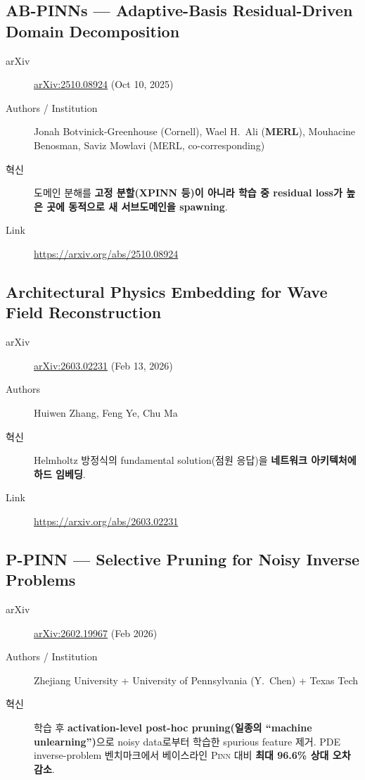 \documentclass[11pt,a4paper,oneside]{report}
\newcommand{\pinn}{\textsc{Pinn}}
\newcommand{\arxivid}[1]{\href{https://arxiv.org/abs/#1}{arXiv:#1}}
\begin{document}
\subsection{AB-PINNs --- Adaptive-Basis Residual-Driven Domain Decomposition}

\begin{description}
\item[arXiv] \arxivid{2510.08924} (Oct 10, 2025)
\item[Authors / Institution] Jonah Botvinick-Greenhouse (Cornell), Wael H.\ Ali (\textbf{MERL}), Mouhacine Benosman, Saviz Mowlavi (MERL, co-corresponding)
\item[혁신] 도메인 분해를 \textbf{고정 분할(XPINN 등)이 아니라 학습 중 residual loss가 높은 곳에 동적으로 새 서브도메인을 spawning}.
\item[Link] \url{https://arxiv.org/abs/2510.08924}
\end{description}

\subsection{Architectural Physics Embedding for Wave Field Reconstruction}

\begin{description}
\item[arXiv] \arxivid{2603.02231} (Feb 13, 2026)
\item[Authors] Huiwen Zhang, Feng Ye, Chu Ma
\item[혁신] Helmholtz 방정식의 fundamental solution(점원 응답)을 \textbf{네트워크 아키텍처에 하드 임베딩}.
\item[Link] \url{https://arxiv.org/abs/2603.02231}
\end{description}

\subsection{P-PINN --- Selective Pruning for Noisy Inverse Problems}

\begin{description}
\item[arXiv] \arxivid{2602.19967} (Feb 2026)
\item[Authors / Institution] Zhejiang University + University of Pennsylvania (Y.\ Chen) + Texas Tech
\item[혁신] 학습 후 \textbf{activation-level post-hoc pruning(일종의 ``machine unlearning'')}으로 noisy data로부터 학습한 spurious feature 제거. PDE inverse-problem 벤치마크에서 베이스라인 \pinn{} 대비 \textbf{최대 96.6\% 상대 오차 감소}.
\end{description}
\end{document}
